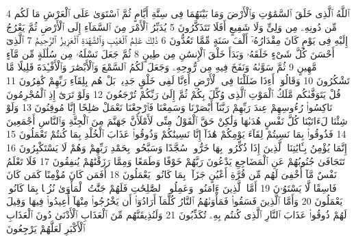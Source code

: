{\tiny\colorbox{cl_aya}{4}} ٱللَّهُ ٱلَّذِى خَلَقَ ٱلسَّمَٰوَٰتِ وَٱلْأَرْضَ وَمَا بَيْنَهُمَا فِى سِتَّةِ أَيَّامٍ ثُمَّ ٱسْتَوَىٰ عَلَى ٱلْعَرْشِ مَا لَكُم مِّن دُونِهِۦ مِن وَلِىٍّ وَلَا شَفِيعٍ أَفَلَا تَتَذَكَّرُونَ
{\tiny\colorbox{cl_aya}{5}} يُدَبِّرُ ٱلْأَمْرَ مِنَ ٱلسَّمَآءِ إِلَى ٱلْأَرْضِ ثُمَّ يَعْرُجُ إِلَيْهِ فِى يَوْمٍ كَانَ مِقْدَارُهُۥٓ أَلْفَ سَنَةٍ مِّمَّا تَعُدُّونَ
{\tiny\colorbox{cl_aya}{6}} ذَٰلِكَ عَٰلِمُ ٱلْغَيْبِ وَٱلشَّهَٰدَةِ ٱلْعَزِيزُ ٱلرَّحِيمُ
{\tiny\colorbox{cl_aya}{7}} ٱلَّذِىٓ أَحْسَنَ كُلَّ شَىْءٍ خَلَقَهُۥ وَبَدَأَ خَلْقَ ٱلْإِنسَٰنِ مِن طِينٍ
{\tiny\colorbox{cl_aya}{8}} ثُمَّ جَعَلَ نَسْلَهُۥ مِن سُلَٰلَةٍ مِّن مَّآءٍ مَّهِينٍ
{\tiny\colorbox{cl_aya}{9}} ثُمَّ سَوَّىٰهُ وَنَفَخَ فِيهِ مِن رُّوحِهِۦ وَجَعَلَ لَكُمُ ٱلسَّمْعَ وَٱلْأَبْصَٰرَ وَٱلْأَفْـِٔدَةَ قَلِيلًا مَّا تَشْكُرُونَ
{\tiny\colorbox{cl_aya}{10}} وَقَالُوٓا۟ أَءِذَا ضَلَلْنَا فِى ٱلْأَرْضِ أَءِنَّا لَفِى خَلْقٍ جَدِيدٍۭ بَلْ هُم بِلِقَآءِ رَبِّهِمْ كَٰفِرُونَ
{\tiny\colorbox{cl_aya}{11}} قُلْ يَتَوَفَّىٰكُم مَّلَكُ ٱلْمَوْتِ ٱلَّذِى وُكِّلَ بِكُمْ ثُمَّ إِلَىٰ رَبِّكُمْ تُرْجَعُونَ
{\tiny\colorbox{cl_aya}{12}} وَلَوْ تَرَىٰٓ إِذِ ٱلْمُجْرِمُونَ نَاكِسُوا۟ رُءُوسِهِمْ عِندَ رَبِّهِمْ رَبَّنَآ أَبْصَرْنَا وَسَمِعْنَا فَٱرْجِعْنَا نَعْمَلْ صَٰلِحًا إِنَّا مُوقِنُونَ
{\tiny\colorbox{cl_aya}{13}} وَلَوْ شِئْنَا لَءَاتَيْنَا كُلَّ نَفْسٍ هُدَىٰهَا وَلَٰكِنْ حَقَّ ٱلْقَوْلُ مِنِّى لَأَمْلَأَنَّ جَهَنَّمَ مِنَ ٱلْجِنَّةِ وَٱلنَّاسِ أَجْمَعِينَ
{\tiny\colorbox{cl_aya}{14}} فَذُوقُوا۟ بِمَا نَسِيتُمْ لِقَآءَ يَوْمِكُمْ هَٰذَآ إِنَّا نَسِينَٰكُمْ وَذُوقُوا۟ عَذَابَ ٱلْخُلْدِ بِمَا كُنتُمْ تَعْمَلُونَ
{\tiny\colorbox{cl_aya}{15}} إِنَّمَا يُؤْمِنُ بِـَٔايَٰتِنَا ٱلَّذِينَ إِذَا ذُكِّرُوا۟ بِهَا خَرُّوا۟ سُجَّدًا وَسَبَّحُوا۟ بِحَمْدِ رَبِّهِمْ وَهُمْ لَا يَسْتَكْبِرُونَ
{\tiny\colorbox{cl_aya}{16}} تَتَجَافَىٰ جُنُوبُهُمْ عَنِ ٱلْمَضَاجِعِ يَدْعُونَ رَبَّهُمْ خَوْفًا وَطَمَعًا وَمِمَّا رَزَقْنَٰهُمْ يُنفِقُونَ
{\tiny\colorbox{cl_aya}{17}} فَلَا تَعْلَمُ نَفْسٌ مَّآ أُخْفِىَ لَهُم مِّن قُرَّةِ أَعْيُنٍ جَزَآءًۢ بِمَا كَانُوا۟ يَعْمَلُونَ
{\tiny\colorbox{cl_aya}{18}} أَفَمَن كَانَ مُؤْمِنًا كَمَن كَانَ فَاسِقًا لَّا يَسْتَوُۥنَ
{\tiny\colorbox{cl_aya}{19}} أَمَّا ٱلَّذِينَ ءَامَنُوا۟ وَعَمِلُوا۟ ٱلصَّٰلِحَٰتِ فَلَهُمْ جَنَّٰتُ ٱلْمَأْوَىٰ نُزُلًۢا بِمَا كَانُوا۟ يَعْمَلُونَ
{\tiny\colorbox{cl_aya}{20}} وَأَمَّا ٱلَّذِينَ فَسَقُوا۟ فَمَأْوَىٰهُمُ ٱلنَّارُ كُلَّمَآ أَرَادُوٓا۟ أَن يَخْرُجُوا۟ مِنْهَآ أُعِيدُوا۟ فِيهَا وَقِيلَ لَهُمْ ذُوقُوا۟ عَذَابَ ٱلنَّارِ ٱلَّذِى كُنتُم بِهِۦ تُكَذِّبُونَ
{\tiny\colorbox{cl_aya}{21}} وَلَنُذِيقَنَّهُم مِّنَ ٱلْعَذَابِ ٱلْأَدْنَىٰ دُونَ ٱلْعَذَابِ ٱلْأَكْبَرِ لَعَلَّهُمْ يَرْجِعُونَ
